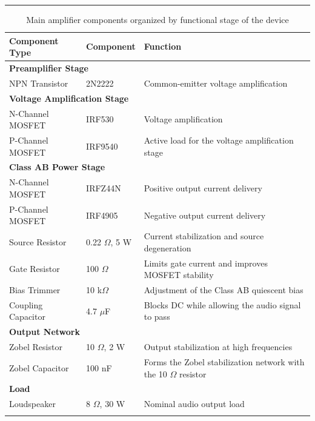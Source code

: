 \documentclass[10pt,a4paper]{article}
\newcommand{\datasheetsection}[1]{%
    \FloatBarrier%
    \par\addvspace{0.30cm}%
    \Needspace{5\baselineskip}%
    \noindent{\large\bfseries\color{datasheetblue}#1}\par%
    \vspace{0.10cm}%
    \hrule%
    \vspace{0.15cm}%
}
\begin{document}
\datasheetsection{Component Summary}
\small
\begin{longtable}{p{5.0cm}p{2.8cm}p{5.5cm}}
\hline
\textbf{Component Type} &\textbf{Component} &\textbf{Function} \\
\hline

\multicolumn{3}{l}{\textbf{Preamplifier Stage}} \\
\hline

NPN Transistor & 2N2222 & Common-emitter voltage amplification \\
\hline

\multicolumn{3}{l}{\textbf{Voltage Amplification Stage}} \\
\hline
N-Channel MOSFET &IRF530 &Voltage amplification \\
P-Channel MOSFET &IRF9540 &Active load for the voltage amplification stage \\
\hline

\multicolumn{3}{l}{\textbf{Class AB Power Stage}} \\
\hline
N-Channel MOSFET &IRFZ44N &Positive output current delivery \\
P-Channel MOSFET &IRF4905 &Negative output current delivery \\
Source Resistor &0.22 $\Omega$, 5 W & Current stabilization and source degeneration \\
Gate Resistor &100 $\Omega$ &Limits gate current and improves MOSFET stability \\
Bias Trimmer &10 k$\Omega$ &Adjustment of the Class AB quiescent bias \\
Coupling Capacitor &4.7 $\mu$F &Blocks DC while allowing the audio signal to pass \\
\hline

\multicolumn{3}{l}{\textbf{Output Network}} \\
\hline
Zobel Resistor &10 $\Omega$, 2 W &Output stabilization at high frequencies \\
Zobel Capacitor &100 nF &Forms the Zobel stabilization network with the 10 $\Omega$ resistor \\
\hline

\multicolumn{3}{l}{\textbf{Load}} \\
\hline
Loudspeaker &8 $\Omega$, 30 W &Nominal audio output load \\
\hline
\caption{Main amplifier components organized by functional stage of the device}
\label{tab:component_summary}
\end{longtable}
\normalsize
\newpage
\end{document}
